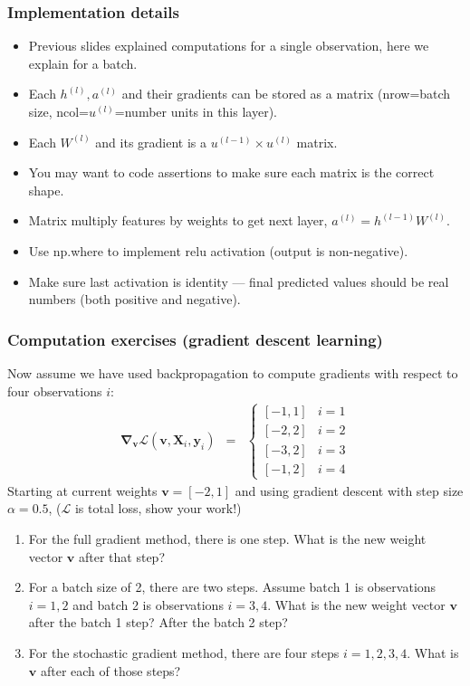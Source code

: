\documentclass{beamer}
\begin{document}
\begin{frame}
  \frametitle{Implementation details}
  \begin{itemize}
  \item Previous slides explained computations for a single
    observation, here we explain for a batch.
  \item Each $h^{(l)},a^{(l)}$ and their gradients can be stored as a
    matrix (nrow=batch size, ncol=$u^{(l)}$=number units in this layer).
  \item Each $W^{(l)}$ and its gradient is a $u^{(l-1)}\times u^{(l)}$
    matrix.
  \item You may want to code assertions to make sure each matrix is
    the correct shape.
  \item Matrix multiply features by weights to get next layer,
    $a^{(l)}=h^{(l-1)} W^{(l)}$.
  \item Use np.where to implement relu activation (output is
    non-negative).
  \item Make sure last activation is identity --- final predicted
    values should be real numbers (both positive and negative).
  \end{itemize}
\end{frame}


\begin{frame}
  \frametitle{Computation exercises (gradient descent learning)}
  Now assume we have used backpropagation to compute gradients with
  respect to four observations $i$:
  \begin{eqnarray*}
    \mathbf \nabla_{\mathbf v}
    \mathcal L(\mathbf v, \mathbf X_i,\mathbf y_i)
    &=& \begin{cases}
      [-1, 1] & i=1\\
      [-2, 2] & i=2\\
      [-3, 2] & i=3\\
      [-1, 2] & i=4
    \end{cases} 
  \end{eqnarray*}
  Starting at current weights $\mathbf v=[-2, 1]$ and using gradient descent
  with step size $\alpha=0.5$,   ($\mathcal L$ is total loss, show your work!)

  \begin{enumerate}
  \item For the full gradient method, there is one step. What is the
    new weight vector $\mathbf v$ after that step?
  \item For a batch size of 2, there are two steps. Assume batch 1 is
    observations $i=1,2$ and batch 2 is observations $i=3,4$. What is the new
    weight vector $\mathbf v$ after the batch 1 step? After the batch
    2 step?
  \item For the stochastic gradient method, there are four steps
    $i=1,2,3,4$. What is $\mathbf v$ after each
    of those steps?
  \end{enumerate}
\end{frame}
\end{document}
